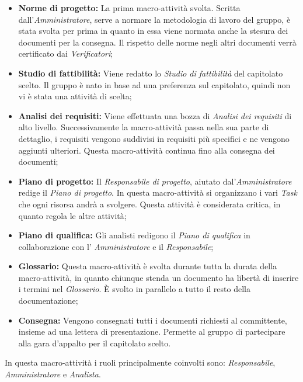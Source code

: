 \documentclass[a4paper]{article}
\begin{document}
			\begin{itemize}
				\item \textbf{Norme di progetto:} La prima macro-attività svolta. Scritta dall'\emph{Amministratore}, serve a normare
				la metodologia di lavoro del gruppo, è stata svolta per prima in quanto in essa viene normata anche la stesura
				dei documenti per la consegna. Il rispetto delle norme negli altri documenti verrà certificato dai \emph{Verificatori}; 
				\item \textbf{Studio di fattibilità:} Viene redatto lo \emph{Studio di fattibilità} del capitolato scelto. Il gruppo è
				nato in base ad una preferenza sul capitolato, quindi non vi è stata una attività di scelta;
				\item \textbf{Analisi dei requisiti:} Viene effettuata una bozza di \emph{Analisi dei requisiti} di alto livello. 
				Successivamente la macro-attività passa nella sua parte di dettaglio, i requisiti vengono suddivisi in requisiti più specifici e 
				ne vengono aggiunti ulteriori. Questa macro-attività continua fino alla consegna dei documenti;
				\item \textbf{Piano di progetto:} Il \emph{Responsabile di progetto}, aiutato dal'\emph{Amministratore} redige il 
				\emph{Piano di progetto}. In questa macro-attività si organizzano i vari \emph{Task} che ogni risorsa andrà a svolgere.
				Questa attività è considerata critica, in quanto regola le altre attività;
				\item \textbf{Piano di qualifica:} Gli analisti redigono il \emph{Piano di qualifica} in collaborazione con l'
				\emph{Amministratore} e il \emph{Responsabile};
				\item \textbf{Glossario:} Questa macro-attività è svolta durante tutta la durata della macro-attività, in quanto chiunque
				stenda un documento ha libertà di inserire i termini nel \emph{Glossario}. È svolto in parallelo a tutto il resto 
				della documentazione;
				\item \textbf{Consegna:} Vengono consegnati tutti i documenti richiesti al committente, insieme ad una lettera di 
				presentazione. Permette al gruppo di partecipare alla gara d'appalto per il capitolato scelto.
			\end{itemize}
			In questa macro-attività i ruoli principalmente coinvolti sono: \emph{Responsabile}, \emph{Amministratore} e \emph{Analista}.
\end{document}

